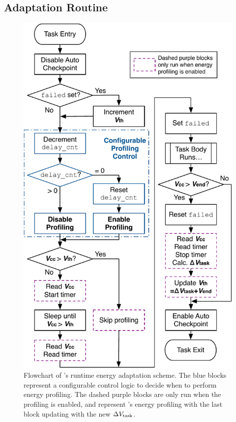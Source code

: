 
\subsection{Adaptation Routine}

\begin{figure}
    \centering
    \includegraphics[width=0.8\columnwidth]{ch5_optic/figures/flowchart.pdf}
    \caption{Flowchart of \nn{}'s runtime energy adaptation scheme. The blue blocks represent a configurable control logic to decide when to perform energy profiling. The dashed purple blocks are only run when the profiling is enabled, and represent \nn{}'s energy profiling with the last block updating  with the new $\Delta V_{\text{task}}$. }
    \label{fig:opta_flowchart}
\end{figure}

